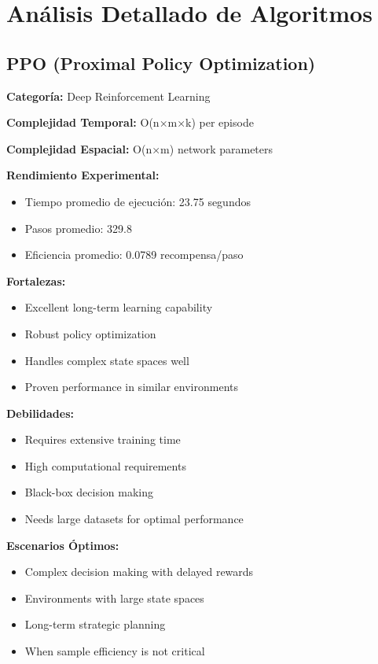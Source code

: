 \section{Análisis Detallado de Algoritmos}


\subsection{PPO (Proximal Policy Optimization)}

\textbf{Categoría:} Deep Reinforcement Learning

\textbf{Complejidad Temporal:} O(n×m×k) per episode

\textbf{Complejidad Espacial:} O(n×m) network parameters

\textbf{Rendimiento Experimental:}
\begin{itemize}
    \item Tiempo promedio de ejecución: 23.75 segundos
    \item Pasos promedio: 329.8
    \item Eficiencia promedio: 0.0789 recompensa/paso
\end{itemize}

\textbf{Fortalezas:}
\begin{itemize}
    \item Excellent long-term learning capability
    \item Robust policy optimization
    \item Handles complex state spaces well
    \item Proven performance in similar environments
\end{itemize}

\textbf{Debilidades:}
\begin{itemize}
    \item Requires extensive training time
    \item High computational requirements
    \item Black-box decision making
    \item Needs large datasets for optimal performance
\end{itemize}

\textbf{Escenarios Óptimos:}
\begin{itemize}
    \item Complex decision making with delayed rewards
    \item Environments with large state spaces
    \item Long-term strategic planning
    \item When sample efficiency is not critical
\end{itemize}

